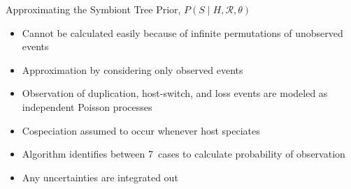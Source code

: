 \documentclass{beamer}
\newcommand{\R}{\ensuremath{\mathcal{R}}}
\begin{document}
\begin{frame}{Approximating the Symbiont Tree Prior, $P\left(S\mid H,\R,\theta\right)$}

\begin{itemize}

\item Cannot be calculated easily because of infinite permutations of unobserved events \pause
\item Approximation by considering only observed events \pause
\item Observation of duplication, host-switch, and loss events are modeled as independent Poisson processes \pause
\item Cospeciation assumed to occur whenever host speciates \pause
\item Algorithm identifies between 7~cases to calculate probability of observation \pause
\item Any uncertainties are integrated out

\end{itemize}

\end{frame}
\end{document}
